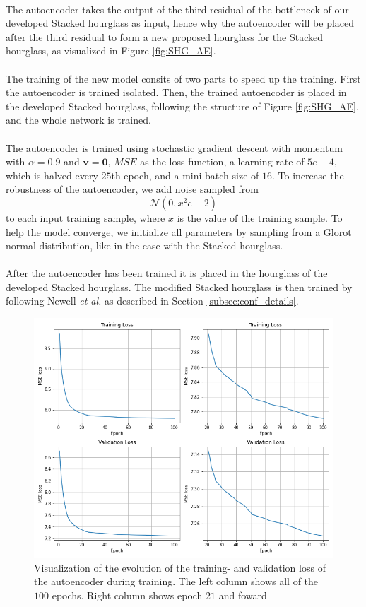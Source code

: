 \documentclass[./main.tex]{subfiles}
\begin{document}
\\
The autoencoder takes the output of the third residual of the bottleneck of our developed Stacked hourglass as input, hence why the autoencoder will be placed after the third residual to form a new proposed hourglass for the Stacked hourglass, as visualized in Figure \ref{fig:SHG_AE}.
\\
\\
The training of the new model consits of two parts to speed up the training. First the autoencoder is trained isolated. Then, the trained autoencoder is placed in the developed Stacked hourglass, following the structure of Figure \ref{fig:SHG_AE}, and the whole network is trained.
\\
\\
The autoencoder is trained using stochastic gradient descent with momentum with $\alpha = 0.9$ and $\bm{v} = \bm{0}$, $MSE$ as the loss function, a learning rate of $5e-4$, which is halved every $25$th epoch, and a mini-batch size of $16$. To increase the robustness of the autoencoder, we add noise sampled from
$$\mathcal{N} \left(0, x^2e-2 \right)$$
to each input training sample, where $x$ is the value of the training sample. To help the model converge, we initialize all parameters by sampling from a Glorot normal distribution, like in the case with the Stacked hourglass.
\\
\\
After the autoencoder has been trained it is placed in the hourglass of the developed Stacked hourglass. The modified Stacked hourglass is then trained by following Newell \textit{et al.} \cite{Newell} as described in Section \ref{subsec:conf_details}.
\begin{figure}[htbp]
    \centering
    \includegraphics[height = 8 cm]{entities/AE_evolution.png}
    \caption{Visualization of the evolution of the training- and validation loss of the autoencoder during training. The left column shows all of the $100$ epochs. Right column shows epoch $21$ and foward}
    \label{fig:AE_evolution}
\end{figure}
\end{document}
